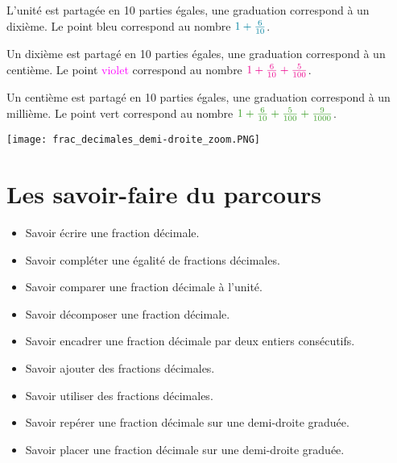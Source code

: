 \documentclass[a4paper,dvipsnames]{article}
\begin{document}
\begin{Mt}
L'unité est partagée en 10 parties égales, une graduation correspond à un dixième. Le point \textcolor{sacado_blue}{bleu} correspond au nombre $\textcolor{sacado_blue}{1+\frac{6}{10}}$.

Un dixième est partagé en 10 parties égales, une graduation correspond à un centième. Le point \textcolor{magenta}{violet} correspond au nombre $\textcolor{magenta}{1+\frac{6}{10}+\frac{5}{100}}$.

Un centième est partagé en 10 parties égales, une graduation correspond à un millième. Le point \textcolor{sacado_green}{vert} correspond au nombre $\textcolor{sacado_green}{1+\frac{6}{10}+\frac{5}{100}+\frac{9}{1000}}$.
\begin{center}
\texttt{[image: frac\_decimales\_demi-droite\_zoom.PNG]}
\end{center}
\end{Mt}

\section{Les savoir-faire du parcours}

\begin{CpsCol}
\begin{itemize}
\item Savoir écrire une fraction décimale.
\item Savoir compléter une égalité de fractions décimales.
\item Savoir comparer une fraction décimale à l'unité.
\item Savoir décomposer une fraction décimale.
\item Savoir encadrer une fraction décimale par deux entiers consécutifs.
\item Savoir ajouter des fractions décimales.
\item Savoir utiliser des fractions décimales.
\item Savoir repérer une fraction décimale sur une demi-droite graduée.
\item Savoir placer une fraction décimale sur une demi-droite graduée.
\end{itemize}
\end{CpsCol}
\end{document}
